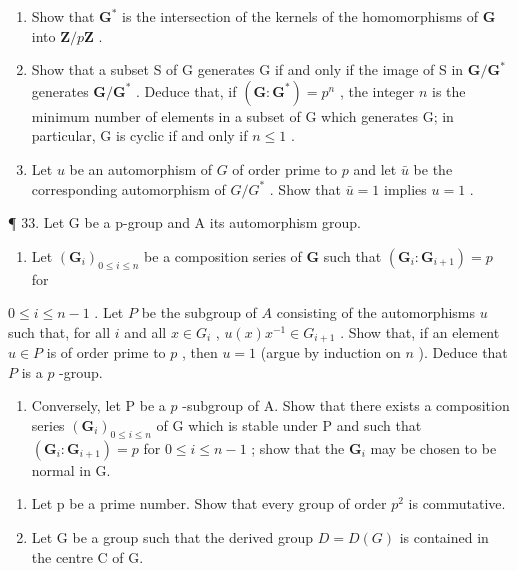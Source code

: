 \begin{enumerate}
\def\labelenumi{(\alph{enumi})}
\item
  Show that \(\mathbf{G}^*\) is the intersection of the kernels of the homomorphisms of \(\mathbf{G}\) into \(\mathbf{Z} / p\mathbf{Z}\) .
\item
  Show that a subset S of G generates G if and only if the image of S in \(\mathbf{G} / \mathbf{G}^*\) generates \(\mathbf{G} / \mathbf{G}^*\) . Deduce that, if \((\mathbf{G}:\mathbf{G}^{*}) = p^{n}\) , the integer \(n\) is the minimum number of elements in a subset of G which generates G; in particular, G is cyclic if and only if \(n\leqslant 1\) .
\item
  Let \(u\) be an automorphism of \(G\) of order prime to \(p\) and let \(\bar{u}\) be the corresponding automorphism of \(G / G^*\) . Show that \(\bar{u} = 1\) implies \(u = 1\) .
\end{enumerate}

¶ 33. Let G be a p-group and A its automorphism group.

\begin{enumerate}
\def\labelenumi{(\alph{enumi})}
\tightlist
\item
  Let \((\mathbf{G}_i)_{0\leqslant i\leqslant n}\) be a composition series of \(\mathbf{G}\) such that \((\mathbf{G}_i:\mathbf{G}_{i + 1}) = p\) for
\end{enumerate}

\(0 \leqslant i \leqslant n - 1\) . Let \(P\) be the subgroup of \(A\) consisting of the automorphisms \(u\) such that, for all \(i\) and all \(x \in G_i\) , \(u(x)x^{-1} \in G_{i+1}\) . Show that, if an element \(u \in P\) is of order prime to \(p\) , then \(u = 1\) (argue by induction on \(n\) ). Deduce that \(P\) is a \(p\) -group.

\begin{enumerate}
\def\labelenumi{(\alph{enumi})}
\setcounter{enumi}{1}
\tightlist
\item
  Conversely, let P be a \(p\) -subgroup of A. Show that there exists a composition series \((\mathbf{G}_i)_{0 \leqslant i \leqslant n}\) of G which is stable under P and such that \((\mathbf{G}_i: \mathbf{G}_{i+1}) = p\) for \(0 \leqslant i \leqslant n-1\) ; show that the \(\mathbf{G}_i\) may be chosen to be normal in G.
\end{enumerate}

\begin{enumerate}
\def\labelenumi{\arabic{enumi}.}
\setcounter{enumi}{33}
\item
  Let p be a prime number. Show that every group of order \(p^{2}\) is commutative.
\item
  Let G be a group such that the derived group \(D = D(G)\) is contained in the centre C of G.
\end{enumerate}

